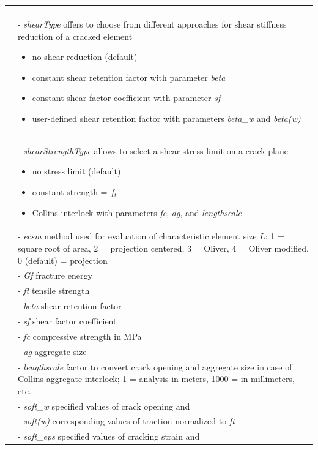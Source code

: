 \documentclass[a4paper]{article}
\newcommand{\param}[1]{{\it #1}}
\begin{document}
\begin{longtable}{|l|p{9cm}|}
\begin{itemize}
\end{itemize}\\
&- \param{shearType} offers to choose from different approaches for shear stiffness reduction of a cracked element
\begin{itemize}\setlength{\itemsep}{-3pt}
\item[0 -] no shear reduction (default)
\item[1 -] constant shear retention factor with parameter \param{beta}
\item[2 -] constant shear factor coefficient with parameter \param{sf}
\item[3 -] user-defined shear retention factor with parameters \param{beta\_w} and \param{beta(w)}
\end{itemize}\\
&- \param{shearStrengthType} allows to select a shear stress limit on a crack plane
\begin{itemize}\setlength{\itemsep}{-3pt}
\item[0 -] no stress limit (default)
\item[1 -] constant strength = $f_t$
\item[2 -] Collins interlock with parameters \param{fc}, \param{ag}, and \param{lengthscale}
\end{itemize}\\
&- \param{ecsm} method used for evaluation of characteristic element size $L$: 1 = square root of area, 2 = projection centered, 3 = Oliver, 4 = Oliver modified, 0 (default) = projection \\
&- \param{Gf} fracture energy\\
&- \param{ft} tensile strength\\
&- \param{beta} shear retention factor\\
&- \param{sf} shear factor coefficient\\
&- \param{fc} compressive strength in MPa \\
&- \param{ag} aggregate size \\
&- \param{lengthscale} factor to convert crack opening and aggregate size in case of Collins aggregate interlock; 1 = analysis in meters, 1000 = in millimeters, etc. \\
&- \param{soft\_w} specified values of crack opening and \\
&- \param{soft(w)} corresponding values of traction normalized to \param{ft}\\
&- \param{soft\_eps} specified values of cracking strain and \\

\end{longtable}
\end{document}
